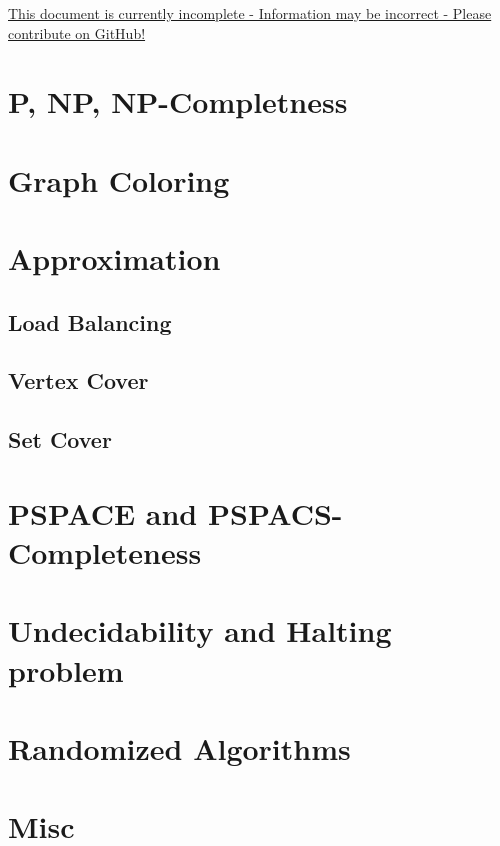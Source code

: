 \documentclass{article}
\begin{document}
\underline{This document is currently incomplete - Information may be incorrect - Please contribute on GitHub!}
\section{P, NP, NP-Completness}
\section{Graph Coloring}
\section{Approximation}
\subsection{Load Balancing}
\subsection{Vertex Cover}
\subsection{Set Cover}
\section{PSPACE and PSPACS-Completeness}
\section{Undecidability and Halting problem}
\section{Randomized Algorithms}
\section{Misc}
\end{document}
